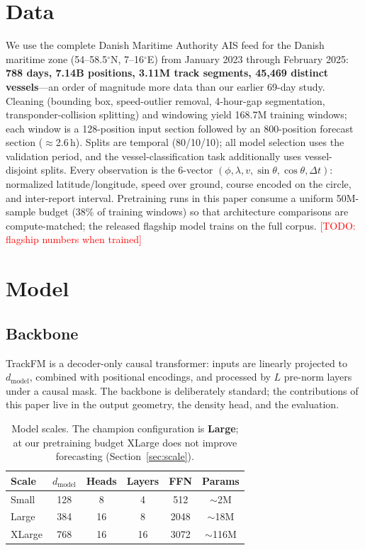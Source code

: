 \documentclass{article}
\newcommand{\todo}[1]{\textcolor{red}{[TODO: #1]}}
\begin{document}
\section{Data}

We use the complete Danish Maritime Authority AIS feed for the Danish
maritime zone (54--58.5$^\circ$N, 7--16$^\circ$E) from January 2023 through
February 2025: \textbf{788 days, 7.14B positions, 3.11M track segments,
45{,}469 distinct vessels}---an order of magnitude more data than our
earlier 69-day study. Cleaning (bounding box, speed-outlier removal,
4-hour-gap segmentation, transponder-collision splitting) and windowing
yield 168.7M training windows; each window is a 128-position input section
followed by an 800-position forecast section ($\approx$2.6\,h). Splits are
temporal (80/10/10); all model selection uses the validation period, and
the vessel-classification task additionally uses vessel-disjoint splits.
Every observation is the 6-vector
$(\phi, \lambda, v, \sin\theta, \cos\theta, \Delta t)$: normalized
latitude/longitude, speed over ground, course encoded on the circle, and
inter-report interval. Pretraining runs in this paper consume a uniform
50M-sample budget (38\% of training windows) so that architecture
comparisons are compute-matched; the released flagship model trains on the
full corpus. \todo{flagship numbers when trained}

\section{Model}

\subsection{Backbone}
TrackFM is a decoder-only causal transformer: inputs are linearly projected
to $d_{\text{model}}$, combined with positional encodings, and processed by
$L$ pre-norm layers under a causal mask. The backbone is deliberately
standard; the contributions of this paper live in the output geometry, the
density head, and the evaluation.

\begin{table}[t]
    \centering
    \caption{Model scales. The champion configuration is \textbf{Large};
    at our pretraining budget XLarge does not improve forecasting
    (Section~\ref{sec:scale}).}
    \label{tab:model_scales}
    \begin{tabular}{lccccc}
        \toprule
        Scale & $d_{\text{model}}$ & Heads & Layers & FFN & Params \\
        \midrule
        Small & 128 & 8 & 4 & 512 & $\sim$2M \\
        Large & 384 & 16 & 8 & 2048 & $\sim$18M \\
        XLarge & 768 & 16 & 16 & 3072 & $\sim$116M \\
        \bottomrule
    \end{tabular}
\end{table}
\end{document}
